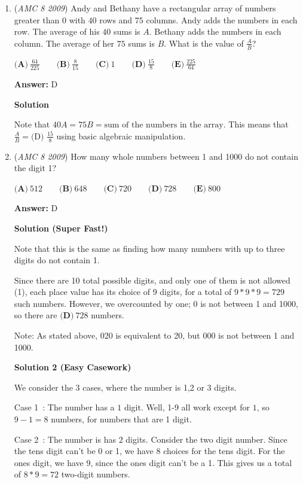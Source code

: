 \begin{enumerate}
 


	\item (\textit{AMC 8 2009}) Andy and Bethany have a rectangular array of numbers greater than 0 with $40$ rows and $75$ columns. Andy adds the numbers in each row. The average of his $40$ sums is $A$. Bethany adds the numbers in each column. The average of her $75$ sums is $B$. What is the value of $\frac{A}{B}$?


 $\textbf{(A)}\ \frac{64}{225}\qquad\textbf{(B)}\ \frac{8}{15}\qquad\textbf{(C)}\ 1\qquad\textbf{(D)}\ \frac{15}{8}\qquad\textbf{(E)}\ \frac{225}{64}$

 \textbf{Answer: }D



\textbf{Solution}

Note that $40A=75B=\text{sum of the numbers in the array}$. This means that $\frac{A}{B}=\boxed{\text{(D) } \frac{15}{8}}$ using basic algebraic    manipulation.

 


	\item (\textit{AMC 8 2009}) How many whole numbers between 1 and 1000 do not contain the digit 1? 


 $\textbf{(A)}\ 512\qquad\textbf{(B)}\ 648\qquad\textbf{(C)}\ 720\qquad\textbf{(D)}\ 728\qquad\textbf{(E)}\ 800$

 \textbf{Answer: }D



\textbf{Solution (Super Fast!)}

Note that this is the same as finding how many numbers with up to three digits do not contain 1.

 Since there are 10 total possible digits, and only one of them is not allowed (1), each place value has its choice of 9 digits, for a total of $9*9*9=729$ such numbers. However, we overcounted by one; 0 is not between 1 and 1000, so there are $\boxed{\textbf{(D)}\ 728}$ numbers.

 
Note: As stated above, 020 is equivalent to 20, but 000 is not between 1 and 1000.

 



\textbf{Solution 2 (Easy Casework)}

We consider the 3 cases, where the number is 1,2 or 3 digits.

 Case 1 : The number has a $1$ digit. Well, 1-9 all work except for $1$, so $9-1=8$ numbers, for numbers that are 1 digit.

 Case 2 : The number is has $2$ digits. Consider the two digit number. Since the tens digit can't be 0 or 1, we have 8 choices for the tens digit. For the ones digit, we have 9, since the ones digit can't be a 1. This gives us a total of $8*9=72$ two-digit numbers.


\end{enumerate}
